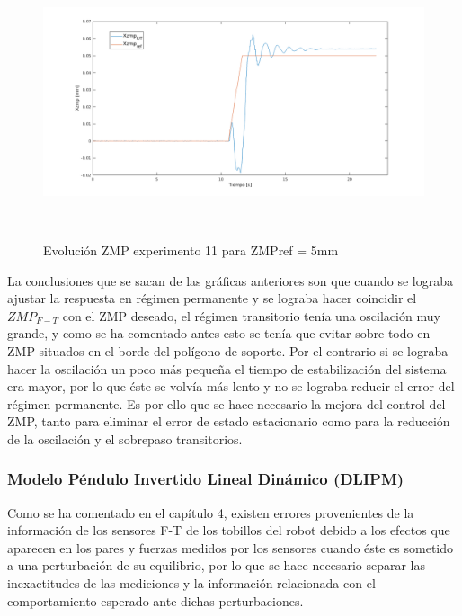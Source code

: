 \begin{figure}[H]
\centering
\includegraphics[width=13cm, height=8cm]{imagenes/apartado_5/5.1/59}
\caption{Evolución ZMP experimento 11 para ZMPref = 5mm}
\label{figura59}
\end{figure}


La conclusiones que se sacan de las gráficas anteriores son que cuando se lograba ajustar la respuesta en régimen permanente y se lograba hacer coincidir el $ZMP_{F-T}$ con el ZMP deseado, el régimen transitorio tenía una oscilación muy grande, y como se ha comentado antes esto se tenía que evitar sobre todo en ZMP situados en el borde del polígono de soporte. Por el contrario si se lograba hacer la oscilación un poco más pequeña el tiempo de estabilización del sistema era mayor, por lo que éste se volvía más lento y no se lograba reducir el error del régimen permanente. Es por ello que se hace necesario la mejora del control del ZMP, tanto para eliminar el error de estado estacionario como para la reducción de la oscilación y el sobrepaso transitorios.

\subsubsection{Modelo Péndulo Invertido Lineal Dinámico (DLIPM)}\label{DLIPM}

Como se ha comentado en el capítulo 4, existen errores provenientes de la información de los sensores F-T de los tobillos del robot debido a los efectos que aparecen en los pares y fuerzas medidos por los sensores cuando éste es sometido a una perturbación de su equilibrio, por lo que se hace necesario separar las inexactitudes de las mediciones y la información relacionada con el comportamiento esperado ante dichas perturbaciones.

